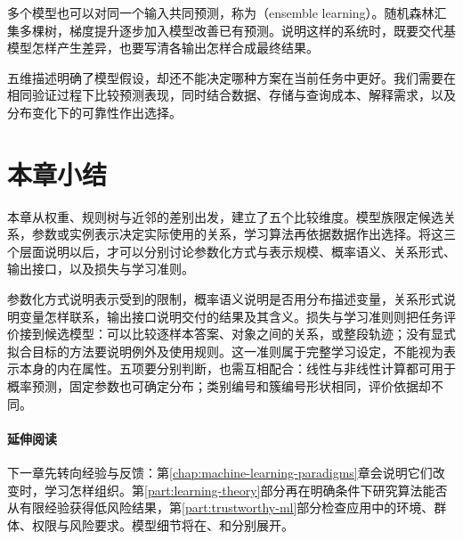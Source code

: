 多个模型也可以对同一个输入共同预测，称为（ensemble learning）。随机森林汇集多棵树，梯度提升逐步加入模型改善已有预测。说明这样的系统时，既要交代基模型怎样产生差异，也要写清各输出怎样合成最终结果。

五维描述明确了模型假设，却还不能决定哪种方案在当前任务中更好。我们需要在相同验证过程下比较预测表现，同时结合数据、存储与查询成本、解释需求，以及分布变化下的可靠性作出选择。

\section{本章小结}
\label{sec:models-summary}

本章从权重、规则树与近邻的差别出发，建立了五个比较维度。模型族限定候选关系，参数或实例表示决定实际使用的关系，学习算法再依据数据作出选择。将这三个层面说明以后，才可以分别讨论参数化方式与表示规模、概率语义、关系形式、输出接口，以及损失与学习准则。

参数化方式说明表示受到的限制，概率语义说明是否用分布描述变量，关系形式说明变量怎样联系，输出接口说明交付的结果及其含义。损失与学习准则则把任务评价接到候选模型：可以比较逐样本答案、对象之间的关系，或整段轨迹；没有显式拟合目标的方法要说明例外及使用规则。这一准则属于完整学习设定，不能视为表示本身的内在属性。五项要分别判断，也需互相配合：线性与非线性计算都可用于概率预测，固定参数也可确定分布；类别编号和簇编号形状相同，评价依据却不同。

\paragraph{延伸阅读}

下一章先转向经验与反馈：第\ref{chap:machine-learning-paradigms}章会说明它们改变时，学习怎样组织。第\ref{part:learning-theory}部分再在明确条件下研究算法能否从有限经验获得低风险结果，第\ref{part:trustworthy-ml}部分检查应用中的环境、群体、权限与风险要求。模型细节将在、和分别展开。